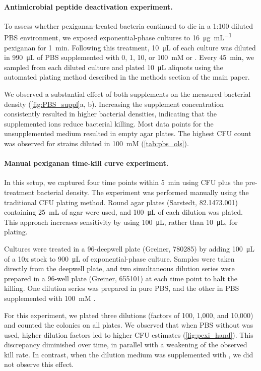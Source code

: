 \paragraph{Antimicrobial peptide deactivation experiment.}
To assess whether pexiganan-treated bacteria continued to die in a 1:100 diluted PBS environment, we exposed exponential-phase cultures to \SI{16}{\micro\gram\per\milli\liter} pexiganan for \SI{1}{\minute}.
Following this treatment, \SI{10}{\micro\liter} of each culture was diluted in \SI{990}{\micro\liter} of PBS supplemented with 0, 1, 10, or \SI{100}{\milli M}  or .
Every \SI{45}{\minute}, we sampled from each diluted culture and plated \SI{10}{\micro\liter} aliquots using the automated plating method described in the methods section of the main paper.

We observed a substantial effect of both supplements on the measured bacterial density (\autoref{fig:PBS_suppl}a, b).
Increasing the supplement concentration consistently resulted in higher bacterial densities, indicating that the supplemented ions reduce bacterial killing.
Most data points for the unsupplemented medium resulted in empty agar plates.
The highest CFU count was observed for strains diluted in \SI{100}{\milli M}  (\autoref{tab:pbs_ols}).

\paragraph{Manual pexiganan time-kill curve experiment.}
In this setup, we captured four time points within \SI{5}{\minute} using CFU plus the pre-treatment bacterial density.
The experiment was performed manually using the traditional CFU plating method.
Round agar plates (Sarstedt, 82.1473.001) containing \SI{25}{\milli\liter} of agar were used, and \SI{100}{\micro\liter} of each dilution was plated.
This approach increases sensitivity by using \SI{100}{\micro\liter}, rather than \SI{10}{\micro\liter}, for plating.

Cultures were treated in a 96-deepwell plate (Greiner, 780285) by adding \SI{100}{\micro\liter} of a 10x stock to \SI{900}{\micro\liter} of exponential-phase culture.
Samples were taken directly from the deepwell plate, and two simultaneous dilution series were prepared in a 96-well plate (Greiner, 655101) at each time point to halt the killing.
One dilution series was prepared in pure PBS, and the other in PBS supplemented with \SI{100}{\milli M} .

For this experiment, we plated three dilutions (factors of 100, 1{,}000, and 10{,}000) and counted the colonies on all plates.
We observed that when PBS without  was used, higher dilution factors led to higher CFU estimates (\autoref{fig:pexi_hand}).
This discrepancy diminished over time, in parallel with a weakening of the observed kill rate.
In contrast, when the dilution medium was supplemented with , we did not observe this effect.

